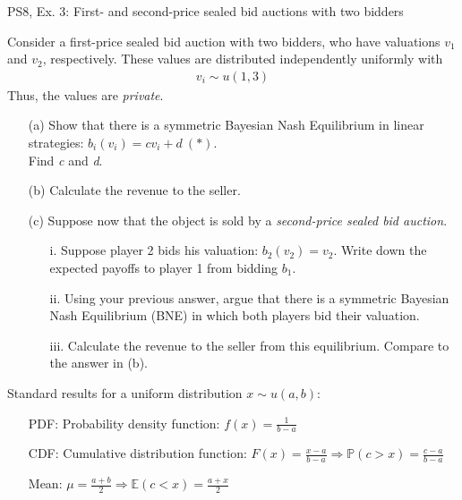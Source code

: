 \begin{frame}{PS8, Ex. 3: First- and second-price sealed bid auctions with two bidders}
    \begin{multicols}{2}
      Consider a first-price sealed bid auction with two bidders, who have valuations $v_1$ and $v_2$, respectively. These values are distributed independently uniformly with
      \begin{align*}
        v_i\sim u(1,3)
      \end{align*}
      Thus, the values are \textit{private}.
      \begin{itemize}
        \item[(a)] Show that there is a symmetric Bayesian Nash Equilibrium in linear strategies: $b_i(v_i) = cv_i + d\ (*)$.\\
                   Find \textit{c} and \textit{d}.
        \item[(b)] Calculate the revenue to the seller.
      \end{itemize}
      \vfill\null\columnbreak
      \begin{itemize}
        \item[(c)] Suppose now that the object is sold by a \textit{second-price sealed bid auction}.
        \begin{itemize}\normalsize
          \item[i.]   Suppose player 2 bids his valuation: $b_2(v_2) = v_2$. Write down the expected payoffs to player 1 from bidding $b_1$.
          \item[ii.]  Using your previous answer, argue that there is a symmetric Bayesian Nash Equilibrium (BNE) in which both players bid their valuation.
          \item[iii.] Calculate the revenue to the seller from this equilibrium. Compare to the answer in (b).
        \end{itemize}
      \end{itemize}
      \vfill\null
    \end{multicols}
    \vspace{-8pt}
    Standard results for a uniform distribution $x\sim u(a, b):$
    \begin{enumerate}
      \item[PDF:] Probability density function: $f(x)=\frac{1}{b-a}$
      \item[CDF:] Cumulative distribution function: $F(x)=\frac{x-a}{b-a}\Rightarrow\mathbb{P}(c>x)=\frac{c-a}{b-a}$
      \item[Mean:] $\mu=\frac{a+b}{2}\Rightarrow\mathbb{E}(c<x)=\frac{a+x}{2}$
    \end{enumerate}
    \vfill\null
\end{frame}


